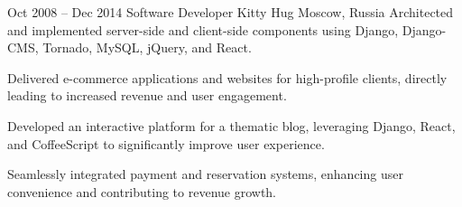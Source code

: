 \cventry
{Oct 2008 – Dec 2014}
{Software Developer}
{Kitty Hug}
{Moscow, Russia}
{}
{Architected and implemented server-side and client-side components using Django, Django-CMS, Tornado, MySQL, jQuery, and React.}

\cvlistitem
{Delivered e-commerce applications and websites for high-profile clients, directly leading to increased revenue and user engagement.}

\cvlistitem
{Developed an interactive platform for a thematic blog, leveraging Django, React, and CoffeeScript to significantly improve user experience.}

\cvlistitem
{Seamlessly integrated payment and reservation systems, enhancing user convenience and contributing to revenue growth.}


